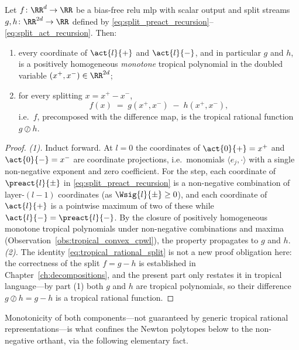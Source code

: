 \begin{theoremenv}\label{thm:split_tropical_rational}
Let $f \colon \RR^d \to \RR$ be a bias-free \ac{relu} \ac{mlp} with scalar output and split streams $g, h \colon \RR^{2d} \to \RR$ defined by \eqref{eq:split_preact_recursion}--\eqref{eq:split_act_recursion}. Then:
\begin{enumerate}
    \item every coordinate of $\act{l}{+}$ and $\act{l}{-}$, and in particular $g$ and $h$, is a positively homogeneous \emph{monotone} tropical polynomial in the doubled variable $(x^+, x^-) \in \RR^{2d}$;
    \item for every splitting $x = x^+ - x^-$,
    \begin{equation}
        f(x) \;=\; g(x^+, x^-) \;-\; h(x^+, x^-),
        \label{eq:tropical_rational_split}
    \end{equation}
    i.e.\ $f$, precomposed with the difference map, is the tropical rational function $g \oslash h$.
\end{enumerate}
\hfill{}
\end{theoremenv}

\begin{proof}
\emph{(1).} Induct forward. At $l = 0$ the coordinates of $\act{0}{+} = x^+$ and $\act{0}{-} = x^-$ are coordinate projections, i.e.\ monomials $\langle e_j, \cdot \rangle$ with a single non-negative exponent and zero coefficient. For the step, each coordinate of $\preact{l}{\pm}$ in \eqref{eq:split_preact_recursion} is a non-negative combination of layer-$(l-1)$ coordinates (as $\Wsig{l}{\pm} \ge 0$), and each coordinate of $\act{l}{+}$ is a pointwise maximum of two of these while $\act{l}{-} = \preact{l}{-}$. By the closure of positively homogeneous monotone tropical polynomials under non-negative combinations and maxima (Observation~\ref{obs:tropical_convex_cpwl}), the property propagates to $g$ and $h$. \emph{(2).} The identity \eqref{eq:tropical_rational_split} is not a new proof obligation here: the correctness of the split $f = g - h$ is established in Chapter~\ref{ch:decompositions}, and the present part only restates it in tropical language---by part (1) both $g$ and $h$ are tropical polynomials, so their difference $g \oslash h = g - h$ is a tropical rational function.
\end{proof}

Monotonicity of both components---not guaranteed by generic tropical rational representations---is what confines the Newton polytopes below to the non-negative orthant, via the following elementary fact.

